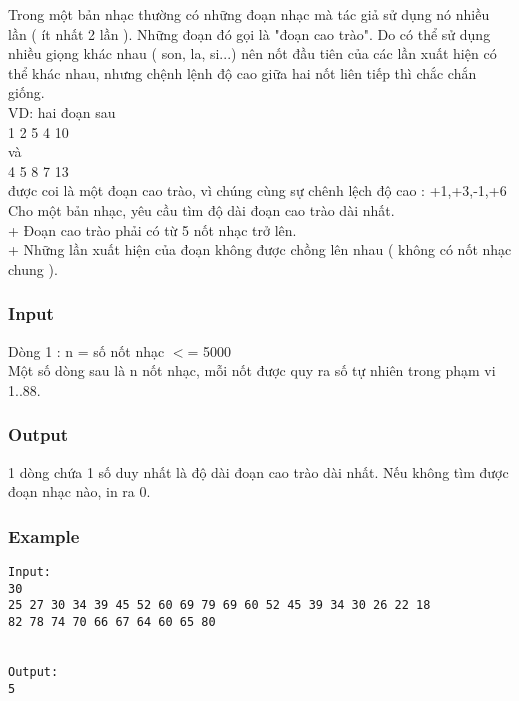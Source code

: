 



   Trong một bản nhạc thường có những đoạn nhạc mà tác giả sử dụng nó nhiều lần ( ít nhất 2 lần ). Những đoạn đó gọi là "đoạn cao trào". Do có thể sử dụng nhiều giọng khác nhau ( son, la, si...) nên nốt đầu tiên của các lần xuất hiện có thể khác nhau, nhưng chệnh lệnh độ cao giữa hai nốt liên tiếp thì chắc chắn giống.   
\\   VD: hai đoạn sau   
\\   1 2 5 4 10   
\\   và   
\\   4 5 8 7 13   
\\   được coi là một đoạn cao trào, vì chúng cùng sự chênh lệch độ cao : +1,+3,-1,+6   
\\   Cho một bản nhạc, yêu cầu tìm độ dài đoạn cao trào dài nhất.   
\\   + Đoạn cao trào phải có từ 5 nốt nhạc trở lên.   
\\   + Những lần xuất hiện của đoạn không được chồng lên nhau ( không có nốt nhạc chung ).   
\\

\subsubsection{   Input  }

   Dòng 1 : n = số nốt nhạc $<$= 5000   
\\   Một số dòng sau là n nốt nhạc, mỗi nốt được quy ra số tự nhiên trong phạm vi 1..88.   
\\

\subsubsection{   Output  }

   1 dòng chứa 1 số duy nhất là độ dài đoạn cao trào dài nhất. Nếu không tìm được đoạn nhạc nào, in ra 0.  

\subsubsection{   Example  }
\begin{verbatim}
Input:
30
25 27 30 34 39 45 52 60 69 79 69 60 52 45 39 34 30 26 22 18
82 78 74 70 66 67 64 60 65 80


Output:
5
\end{verbatim}